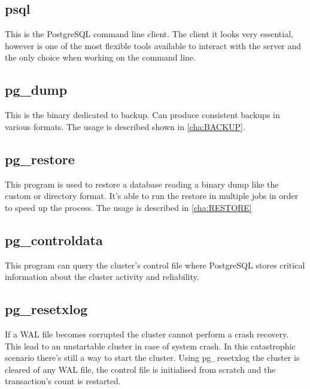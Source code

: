 \subsection{psql}

This is the PostgreSQL command line client. The client it looks very essential, however is one of
the most flexible tools available to interact with the server and the only choice when working on
the command line.

\subsection{pg\_dump}

\label{sub:PGDUMP}

This is the binary dedicated to backup. Can produce consistent backups in
various formats. The usage is described shown in \ref{cha:BACKUP}.

\subsection{pg\_restore}

This program is used to restore a database reading a binary dump like the
custom or directory format. It's able to run the restore in multiple jobs in
order to speed up the process. The usage is described in \ref{cha:RESTORE}

\subsection{pg\_controldata}\label{sub:PGCONTROLDATA}

This program can query the cluster's control file where PostgreSQL stores
critical information about the cluster activity and reliability.

\subsection{pg\_resetxlog}

If a WAL file becomes corrupted the cluster cannot perform a crash recovery.
This lead to an unstartable cluster in case of system crash. In this
catastrophic scenario there's still a way to start the cluster. Using
pg\_resetxlog the cluster is cleared of any WAL file, the control file is
initialised from scratch and the transaction's count is restarted.\newline

